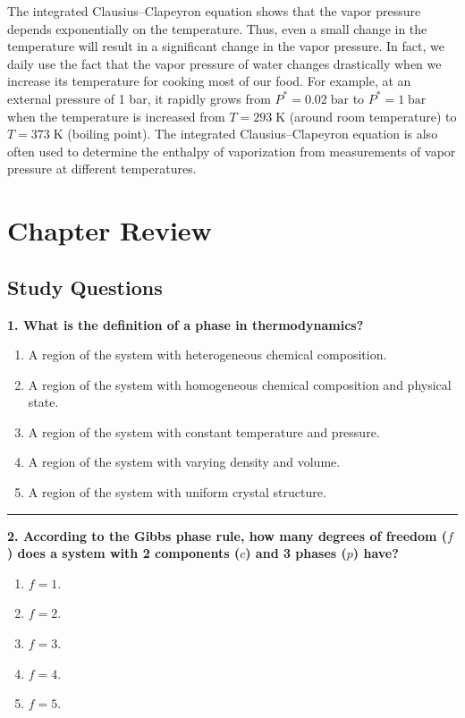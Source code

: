 \documentclass[
  9pt,
]{extbook}
\providecommand{\tightlist}{%
  \setlength{\itemsep}{0pt}\setlength{\parskip}{0pt}}
\theoremstyle{definition}
\theoremstyle{definition}
\theoremstyle{definition}
\theoremstyle{remark}
\begin{document}
The integrated Clausius--Clapeyron equation shows that the vapor pressure depends exponentially on the temperature. Thus, even a small change in the temperature will result in a significant change in the vapor pressure. In fact, we daily use the fact that the vapor pressure of water changes drastically when we increase its temperature for cooking most of our food. For example, at an external pressure of 1 bar, it rapidly grows from \(P^*=0.02\;\text{bar}\) to \(P^*=1\;\text{bar}\) when the temperature is increased from \(T=293\;\mathrm{K}\) (around room temperature) to \(T=373\;\mathrm{K}\) (boiling point). The integrated Clausius--Clapeyron equation is also often used to determine the enthalpy of vaporization from measurements of vapor pressure at different temperatures.

\hypertarget{rev12}{%
\section{Chapter Review}\label{rev12}}

\hypertarget{quest12}{%
\subsection{Study Questions}\label{quest12}}

\textbf{1. What is the definition of a phase in thermodynamics?}

\begin{enumerate}
\def\labelenumi{\alph{enumi}.}
\tightlist
\item
  A region of the system with heterogeneous chemical composition.
\item
  A region of the system with homogeneous chemical composition and physical state.
\item
  A region of the system with constant temperature and pressure.
\item
  A region of the system with varying density and volume.
\item
  A region of the system with uniform crystal structure.
\end{enumerate}

\begin{center}\rule{0.5\linewidth}{0.5pt}\end{center}

\textbf{2. According to the Gibbs phase rule, how many degrees of freedom (\(f\)) does a system with 2 components (\(c\)) and 3 phases (\(p\)) have?}

\begin{enumerate}
\def\labelenumi{\alph{enumi}.}
\tightlist
\item
  \(f = 1\).
\item
  \(f = 2\).
\item
  \(f = 3\).
\item
  \(f = 4\).
\item
  \(f = 5\).
\end{enumerate}
\end{document}
